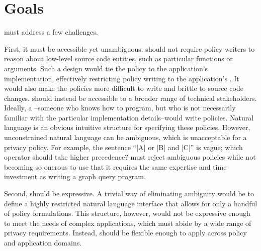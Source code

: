 \section{Goals}
\syslang{} must address a few challenges.

First, it must be accessible yet unambiguous.
%
\syslang{} should not require policy writers to reason about low-level source code entities, such as particular functions or arguments.
%
Such a design would tie the policy to the application's implementation, effectively restricting policy writing to the application's \devs.
%
It would also make the policies more difficult to write and brittle to source code changes.
%
\syslang{} should instead be accessible to a broader range of technical stakeholders.
%
Ideally, a \ce--someone who knows how to program, 
but who is not necessarily familiar with the particular implementation details--would write policies.
%
% 
Natural language is an obvious intuitive structure for specifying these policies.
%
However, unconstrained natural language can be ambiguous, which is unacceptable for a privacy policy.
%
For example, the sentence ``|A| or |B| and |C|'' is vague; which operator should take higher precedence?
%
\syslang{} must reject ambiguous policies while not becoming so onerous to use that it 
requires the same expertise and time investment as writing a graph query program.

Second, \syslang{} should be expressive.
%
A trivial way of eliminating ambiguity would be to define a highly restricted natural language interface that allows for only a handful of policy formulations.
%
This structure, however, would not be expressive enough to meet the needs of complex applications, 
which must abide by a wide range of privacy requirements.
%
Instead, \syslang{} should be flexible enough to apply across policy and application domains.


